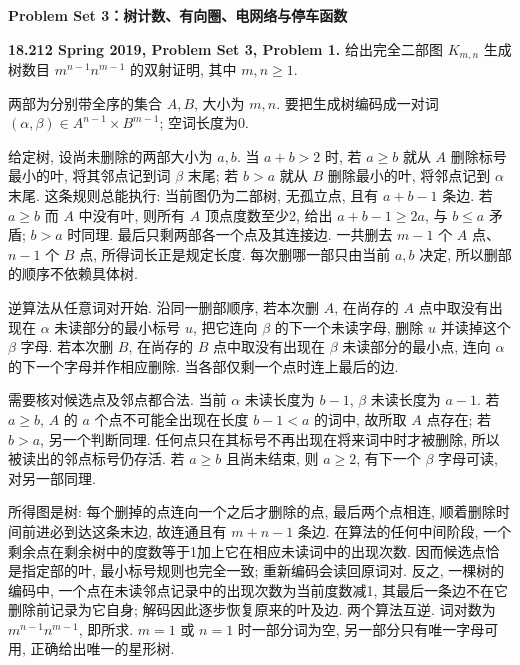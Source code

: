\par\medskip\noindent\textbf{Problem Set 3：树计数、有向圈、电网络与停车函数}

\begin{exercise}\label{mit:18212-pset3-q1}
\textbf{18.212 Spring 2019, Problem Set 3, Problem 1.}
给出完全二部图 $K_{m,n}$ 生成树数目 $m^{n-1}n^{m-1}$ 的双射证明, 其中 $m,n\ge1$.
\end{exercise}
\begin{solution}
两部为分别带全序的集合 $A,B$, 大小为 $m,n$. 要把生成树编码成一对词
$(\alpha,\beta)\in A^{n-1}\times B^{m-1}$; 空词长度为0.

给定树, 设尚未删除的两部大小为 $a,b$. 当 $a+b>2$ 时, 若 $a\ge b$ 就从 $A$ 删除标号最小的叶, 将其邻点记到词 $\beta$ 末尾; 若 $b>a$ 就从 $B$ 删除最小的叶, 将邻点记到 $\alpha$ 末尾. 这条规则总能执行: 当前图仍为二部树, 无孤立点, 且有 $a+b-1$ 条边. 若 $a\ge b$ 而 $A$ 中没有叶, 则所有 $A$ 顶点度数至少2, 给出 $a+b-1\ge2a$, 与 $b\le a$ 矛盾; $b>a$ 时同理. 最后只剩两部各一个点及其连接边. 一共删去 $m-1$ 个 $A$ 点、$n-1$ 个 $B$ 点, 所得词长正是规定长度. 每次删哪一部只由当前 $a,b$ 决定, 所以删部的顺序不依赖具体树.

逆算法从任意词对开始. 沿同一删部顺序, 若本次删 $A$, 在尚存的 $A$ 点中取没有出现在 $\alpha$ 未读部分的最小标号 $u$, 把它连向 $\beta$ 的下一个未读字母, 删除 $u$ 并读掉这个 $\beta$ 字母. 若本次删 $B$, 在尚存的 $B$ 点中取没有出现在 $\beta$ 未读部分的最小点, 连向 $\alpha$ 的下一个字母并作相应删除. 当各部仅剩一个点时连上最后的边.

需要核对候选点及邻点都合法. 当前 $\alpha$ 未读长度为 $b-1$, $\beta$ 未读长度为 $a-1$. 若 $a\ge b$, $A$ 的 $a$ 个点不可能全出现在长度 $b-1<a$ 的词中, 故所取 $A$ 点存在; 若 $b>a$, 另一个判断同理. 任何点只在其标号不再出现在将来词中时才被删除, 所以被读出的邻点标号仍存活. 若 $a\ge b$ 且尚未结束, 则 $a\ge2$, 有下一个 $\beta$ 字母可读, 对另一部同理.

所得图是树: 每个删掉的点连向一个之后才删除的点, 最后两个点相连, 顺着删除时间前进必到达这条末边, 故连通且有 $m+n-1$ 条边. 在算法的任何中间阶段, 一个剩余点在剩余树中的度数等于1加上它在相应未读词中的出现次数. 因而候选点恰是指定部的叶, 最小标号规则也完全一致; 重新编码会读回原词对. 反之, 一棵树的编码中, 一个点在未读邻点记录中的出现次数为当前度数减1, 其最后一条边不在它删除前记录为它自身; 解码因此逐步恢复原来的叶及边. 两个算法互逆. 词对数为 $m^{n-1}n^{m-1}$, 即所求. $m=1$ 或 $n=1$ 时一部分词为空, 另一部分只有唯一字母可用, 正确给出唯一的星形树.
\end{solution}

